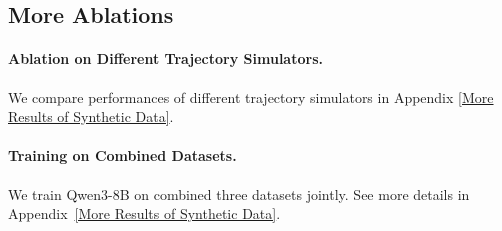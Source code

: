 \subsection{More Ablations}
\paragraph{Ablation on Different Trajectory Simulators.}
We compare performances of different trajectory simulators in Appendix \ref{More Results of Synthetic Data}.

\paragraph{Training on Combined Datasets.}
We train Qwen3-8B on combined three datasets jointly. See more details in Appendix~\ref{More Results of Synthetic Data}.

